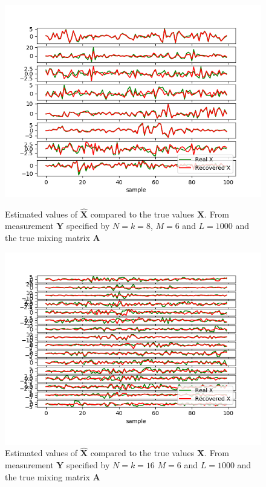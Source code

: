 \begin{figure}[H]
    \begin{minipage}[t]{.45\textwidth}
    	\centering
		\includegraphics[scale=0.5]{figures/ch_6/M-SBL_AR1.png}
		\caption{Estimated values of $\hat{\mathbf{X}}$ compared to the true 					values $\mathbf{X}$. From measurement $\mathbf{Y}$ specified by $N=k=8$, $M = 6$ and $L=1000$ and the true mixing matrix $\mathbf{A}$}
		\label{fig:AR1}
    \end{minipage} 
    \hfill
    \begin{minipage}[t]{.45\textwidth}
        \centering
		\includegraphics[scale=0.5]{figures/ch_6/M-SBL_AR2.png}
		\caption{Estimated values of $\hat{\mathbf{X}}$ compared to the true 					values $\mathbf{X}$. From measurement $\mathbf{Y}$ specified by $N=k=16$ $M = 6$ and $L=1000$ and the true mixing matrix $\mathbf{A}$}
		\label{fig:AR2}
    \end{minipage}
\end{figure}
